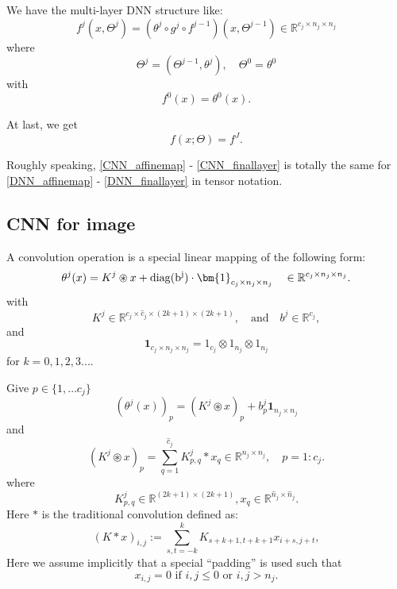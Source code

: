 We have the multi-layer DNN structure like:
	\begin{equation}\label{CNN_iteration_vector}
	f^j(x,\Theta^j) = (\theta^j\circ g^{j}\circ f^{j-1})(x,\Theta^{j-1}) \in \mathbb{R}^{c_j \times n_j \times n_j }
	\end{equation}
where
\begin{equation}
\Theta^j=(\Theta^{j-1},\theta^j), \quad \Theta^0=\theta^0
\end{equation}
	with
	\begin{equation}
	f^0(x)=\theta^0(x).
	\end{equation}

At last, we get
	\begin{equation}\label{CNN_finallayer}
	f(x; \Theta) = f^J.
	\end{equation}

        Roughly speaking, \eqref{CNN_affinemap} -
        \eqref{CNN_finallayer} is totally the same for \eqref{DNN_affinemap}
        - \eqref{DNN_finallayer} in tensor notation.

\subsection{CNN for image}
A convolution operation is a special linear mapping of the following form:
\begin{equation}
\theta^j(x) = K^j \circledast x + {\rm{diag}(b^j)} \cdot \bm{1}_{c_j \times n_j \times n_j} \quad
\in\mathbb R^{c_j\times n_j\times n_j}.
\end{equation}
with
	\begin{equation}
	K^j \in \mathbb{R}^{ c_{j} \times \hat c_{j} \times (2k+1) \times (2k+1)},  \quad \text{and} \quad b^j \in \mathbb{R}^{c_j},
	\end{equation}
	and
	\begin{equation}
	\bm{1}_{c_j \times n_j \times n_j} = 1_{c_{j}} \otimes 1_{n_j} \otimes 1_{n_j}
	\end{equation}
for $k = 0, 1, 2, 3...$.

Give $p\in \{1,\ldots c_j\}$
\begin{equation}
(\theta^j(x))_p= (K^j \circledast x)_p+b^j_p{\bm 1}_{n_j\times n_j}
\end{equation}
and
\begin{equation}
 (K^j \circledast x)_p
= \sum_{q=1}^{\hat c_{j}} K^{j}_{p,q} \ast x_q \in \mathbb{R}^{n_j \times n_j}, \quad p= 1:c_j.
\end{equation}
where
$$
K^{j}_{p,q}\in \mathbb R^{(2k+1)\times (2k+1)}, x_q\in \mathbb
R^{\hat n_{j}\times \hat n_{j}}.
$$
Here $\ast$ is the traditional convolution defined as:
\begin{equation}\label{ConvPadding}
(K \ast x)_{i,j} :=\sum_{s, t = -k}^k  K_{s+k+1,t+k+1} x_{i + s, j + t},
\end{equation}
Here we assume implicitly that a special ``padding'' is used such that
\begin{equation}
  \label{zero-padding}
x_{i,j}=0 \mbox{ if } i, j\le 0 \mbox{ or } i, j > n_j.
\end{equation}


